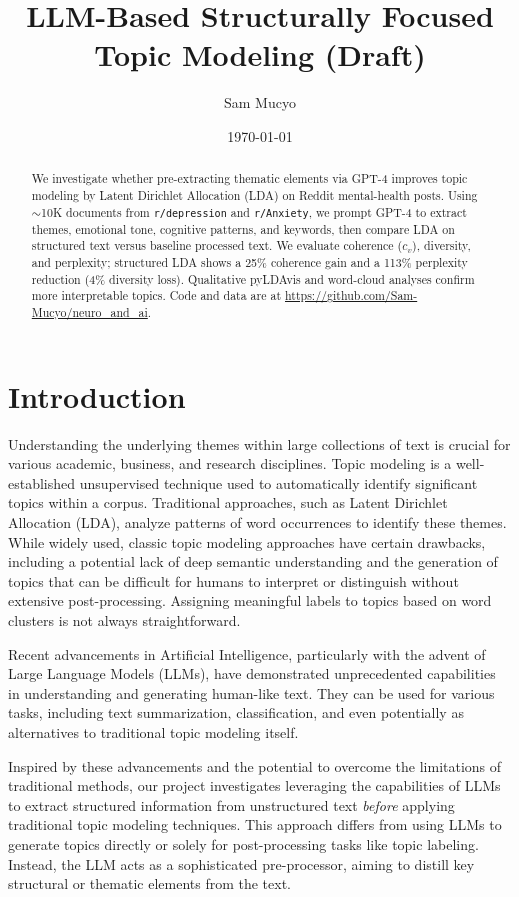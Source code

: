 \documentclass{article}
\title{LLM-Based Structurally Focused Topic Modeling (Draft)}
\author{Sam Mucyo}
\date{\today}
\begin{document}
\maketitle
\doublespacing

\begin{abstract}
    We investigate whether pre-extracting thematic elements via GPT-4 improves topic modeling by Latent Dirichlet Allocation (LDA) on Reddit mental-health posts. Using $\sim$10K documents from \texttt{r/depression} and \texttt{r/Anxiety}, we prompt GPT-4 to extract themes, emotional tone, cognitive patterns, and keywords, then compare LDA on structured text versus baseline processed text. We evaluate coherence ($c_v$), diversity, and perplexity; structured LDA shows a 25\% coherence gain and a 113\% perplexity reduction (4\% diversity loss). Qualitative pyLDAvis and word-cloud analyses confirm more interpretable topics. Code and data are at \url{https://github.com/Sam-Mucyo/neuro_and_ai}.
\end{abstract}

\section{Introduction}

Understanding the underlying themes within large collections of text is crucial for various academic, business, and research disciplines. Topic modeling is a well-established unsupervised technique used to automatically identify significant topics within a corpus. Traditional approaches, such as Latent Dirichlet Allocation (LDA), analyze patterns of word occurrences to identify these themes. While widely used, classic topic modeling approaches have certain drawbacks, including a potential lack of deep semantic understanding and the generation of topics that can be difficult for humans to interpret or distinguish without extensive post-processing. Assigning meaningful labels to topics based on word clusters is not always straightforward.

Recent advancements in Artificial Intelligence, particularly with the advent of Large Language Models (LLMs), have demonstrated unprecedented capabilities in understanding and generating human-like text. They can be used for various tasks, including text summarization, classification, and even potentially as alternatives to traditional topic modeling itself.

Inspired by these advancements and the potential to overcome the limitations of traditional methods, our project investigates leveraging the capabilities of LLMs to extract structured information from unstructured text \emph{before} applying traditional topic modeling techniques. This approach differs from using LLMs to generate topics directly or solely for post-processing tasks like topic labeling. Instead, the LLM acts as a sophisticated pre-processor, aiming to distill key structural or thematic elements from the text.
\end{document}
